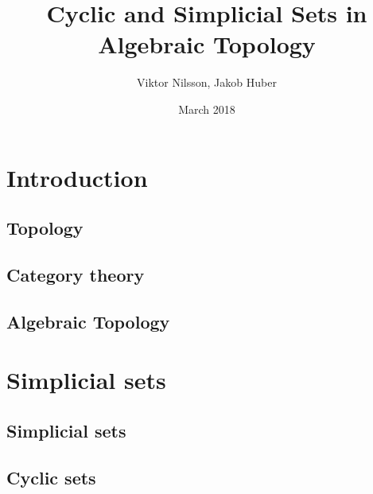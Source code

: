 \documentclass{report}
\title{Cyclic and Simplicial Sets in Algebraic Topology}
\author{Viktor Nilsson, Jakob Huber}
\date{March 2018}
\theoremstyle{definition}
\begin{document}
    \maketitle
    
    \begin{abstract}
        
    \end{abstract}
    
    \tableofcontents
    
    \chapter{Introduction}
        
        
        \section{Topology}
            
        \section{Category theory}
            
        \section{Algebraic Topology}
            
    
    \chapter{Simplicial sets}
    
        \section{Simplicial sets}
            
        \section{Cyclic sets}
            
    
    \printbibliography
\end{document}
